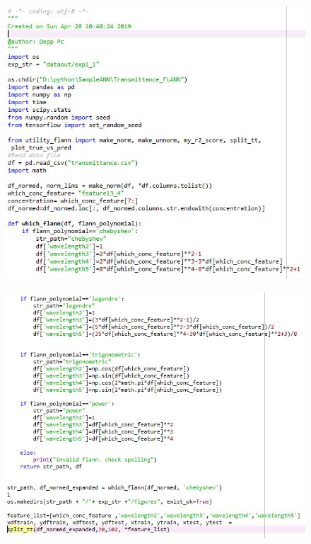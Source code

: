 \documentclass[]{article}
\begin{document}
\begin{figure}
\centering
\includegraphics[width=1\textwidth,height=\textheight]{images/flann1.jpg}
\end{figure}


\begin{figure}
\centering
\includegraphics[width=1\textwidth,height=\textheight]{images/flann2.jpg}
\end{figure}
\end{document}

